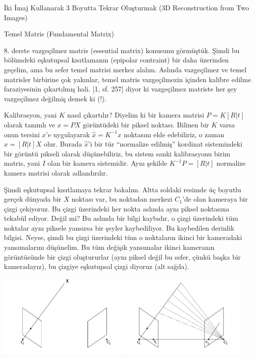 \documentclass[12pt,fleqn]{article}\usepackage{../../common}
\begin{document}
İki İmaj Kullanarak 3 Boyutta Tekrar Oluşturmak (3D Reconstruction from Two Images)

Temel Matris (Fundamental Matrix)

8. derste vazgeçilmez matris (essential matrix) konusunu görmüştük. Şimdi
bu bölümdeki eşkutupsal kısıtlamanın (epipolar contraint) bir daha
üzerinden geçelim, ama bu sefer temel matrisi merkez alalım. Aslında
vazgeçilmez ve temel matrisler birbirine çok yakınlar, temel matris
vazgeçilmezin içinden kalibre edilme faraziyesinin çıkartılmış hali. [1,
sf. 257] diyor ki vazgeçilmez matriste her şey vazgeçilmez değilmiş demek
ki (!).

Kalibrasyon, yani $K$ nasıl çıkartılır? Diyelim ki bir kamera matrisi
$P = K[R | t]$ olarak tanımlı ve $x = PX$ görüntüdeki bir piksel
noktası. Bilinen bir $K$ varsa onun tersini $x$'e uygulayarak
$\hat{x} = K ^{-1}x$ noktasını elde edebiliriz, o zaman
$\hat{x} = [R | t]X$ olur. Burada $\hat{x}$'i bir tür ``normalize edilmiş''
kordinat sistemindeki bir görüntü pikseli olarak düşünebiliriz, bu sistem
sanki kalibrasyonu birim matris, yani $I$ olan bir kamera sistemidir. Aynı
şekilde $K ^{-1} P = [R|t]$ normalize kamera matrisi olarak adlandırılır.

Şimdi eşkutupsal kısıtlamaya tekrar bakalım. Altta soldaki resimde üç
boyutlu gerçek dünyada bir $X$ noktası var, bu noktadan merkezi $C_1$'de
olan kameraya bir çizgi çekiyoruz. Bu çizgi üzerindeki her nokta aslında
aynı piksel noktasına tekabül ediyor. Değil mi? Bu aslında bir bilgi
kaybıdır, o çizgi üzerindeki tüm noktalar aynı piksele yansırsa bir şeyler
kaybediliyor. Bu kaybedilen derinlik bilgisi. Neyse, şimdi bu çizgi
üzerindeki tüm o noktaların ikinci bir kameradaki yansımalarını
düşünelim. Bu tüm değişik yansımalar ikinci kameranın görüntüsünde bir
çizgi oluştururlar (aynı piksel değil bu sefer, çünkü başka bir
kameradayız), bu çizgiye eşkutupsal çizgi diyoruz (alt sağda).

\includegraphics[width=17em]{vision_20recons_04.png}
\includegraphics[width=17em]{vision_20recons_05.png}
\end{document}
